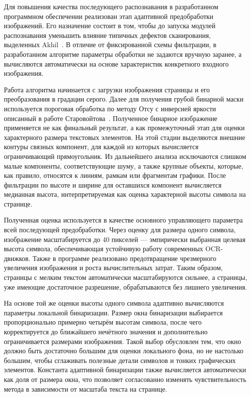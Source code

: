 Для повышения качества последующего распознавания в разработанном программном обеспечении реализован этап адаптивной предобработки изображений. Его назначение состоит в том, чтобы до запуска модулей распознавания уменьшить влияние типичных дефектов сканирования, выделенных Akhil~\cite{refAkhil}. В отличие от фиксированной схемы фильтрации, в разработанном алгоритме параметры обработки не задаются вручную заранее, а вычисляются автоматически на основе характеристик конкретного входного изображения.

Работа алгоритма начинается с загрузки изображения страницы и его преобразования в градации серого. Далее для получения грубой бинарной маски используется пороговая обработка по методу Отсу с инверсией яркости описанный в работе Старовойтова~\cite{refStarovoytov}. Полученное бинарное изображение применяется не как финальный результат, а как промежуточный этап для оценки характерного размера текстовых элементов. На этой стадии выделяются внешние контуры связных компонент, для каждой из которых вычисляется ограничивающий прямоугольник. Из дальнейшего анализа исключаются слишком малые компоненты, соответствующие шуму, а также крупные объекты, которые, как правило, относятся к линиям, рамкам или фрагментам графики. После фильтрации по высоте и ширине для оставшихся компонент вычисляется медианная высота, интерпретируемая как оценка характерной высоты символа на странице.

Полученная оценка используется в качестве основного управляющего параметра всей последующей предобработки. Через оценку для размера одного символа, изображение масштабируется до 40 пикселей --- эмпирически выбранная целевая высота символа, обеспечивающая устойчивую работу современных OCR-движков. Также в программе реализовано предотвращение чрезмерного увеличения изображения и роста вычислительных затрат. Таким образом, страницы с мелким текстом автоматически масштабируются сильнее, а страницы, уже имеющие достаточное разрешение, обрабатываются без лишнего увеличения.

На основе той же оценки высоты одного символа адаптивно вычисляются параметры локальной бинаризации. Размер окна бинаризации выбирается пропорционально примерно четырём высотам символа, после чего корректируется до ближайшего нечётного значения и дополнительно ограничивается размерами изображения. Такой выбор обусловлен тем, что окно должно быть достаточно большим для оценки локального фона, но не настолько большим, чтобы сглаживать полезные детали символов и тонких графических элементов. Константа адаптивной бинаризации также вычисляется автоматически как доля от размера окна, что позволяет согласованно изменять чувствительность метода в зависимости от масштаба текста на странице.

